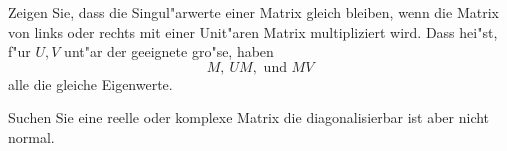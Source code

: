 \documentclass[a4,11pt]{article}
\begin{document}
\begin{aufgabe}[4 Punkte]
Zeigen Sie, dass die Singul"arwerte einer Matrix gleich bleiben, wenn die Matrix von links oder rechts mit einer Unit"aren Matrix multipliziert wird. Dass hei"st, f"ur $U, V$ unt"ar der geeignete gro"se, haben
\[
M, \ UM, \text{ und } MV
\]
alle die gleiche Eigenwerte.
\end{aufgabe}


 \begin{aufgabe}[4 Punkte]
Suchen Sie eine reelle oder komplexe Matrix die diagonalisierbar ist aber nicht normal.
 \end{aufgabe}


\end{document}
